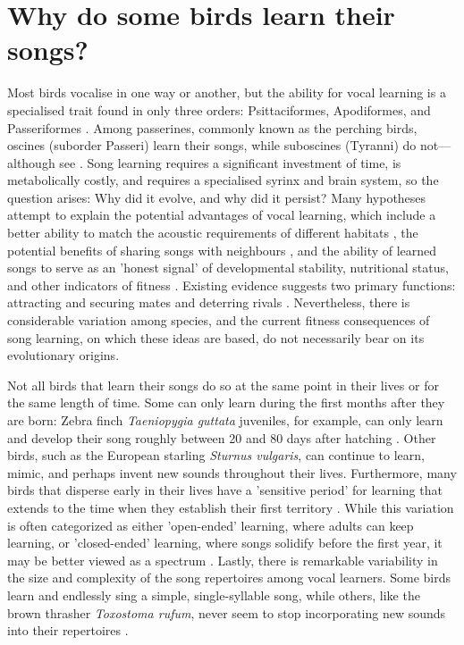 \section{Why do some birds learn their songs?}
Most birds vocalise in one way or another, but the ability for vocal learning is a specialised trait found in only three orders: Psittaciformes, Apodiformes, and Passeriformes \autocite{kroodsma2004,packert2018}. Among passerines, commonly known as the perching birds, oscines (suborder Passeri) learn their songs, while suboscines (Tyranni) do not---although see \cite{searcy2021,tencate2021}. Song learning requires a significant investment of time, is metabolically costly, and requires a specialised syrinx and brain system, so the question arises: Why did it evolve, and why did it persist? Many hypotheses attempt to explain the potential advantages of vocal learning, which include a better ability to match the acoustic requirements of different habitats \autocite{hansen1979,rios-chelen2012}, the potential benefits of sharing songs with neighbours \autocite{payne1982}, and the ability of learned songs to serve as an 'honest signal’ of developmental stability, nutritional status, and other indicators of fitness \autocite{Nowicki2002,ritchie2008}. Existing evidence suggests two primary functions: attracting and securing mates and deterring rivals \autocite{collins2004}. Nevertheless, there is considerable variation among species, and the current fitness consequences of song learning, on which these ideas are based, do not necessarily bear on its evolutionary origins.

Not all birds that learn their songs do so at the same point in their lives or for the same length of time. Some can only learn during the first months after they are born: Zebra finch \textit{Taeniopygia guttata} juveniles, for example, can only learn and develop their song roughly between 20 and 80 days after hatching \autocite{liu2004}. Other birds, such as the European starling \textit{Sturnus vulgaris},  can continue to learn, mimic, and perhaps invent new sounds throughout their lives. Furthermore, many birds that disperse early in their lives have a 'sensitive period’ for learning that extends to the time when they establish their first territory \autocite{beecher2005,liu2004}. While this variation is often categorized as either 'open-ended' learning, where adults can keep learning, or 'closed-ended' learning, where songs solidify before the first year, it may be better viewed as a spectrum \autocite{brenowitz2005}. Lastly, there is remarkable variability in the size and complexity of the song repertoires among vocal learners. Some birds learn and endlessly sing a simple, single-syllable song, while others, like the brown thrasher \textit{Toxostoma rufum}, never seem to stop incorporating new sounds into their repertoires \autocite{Boughey1981}.

